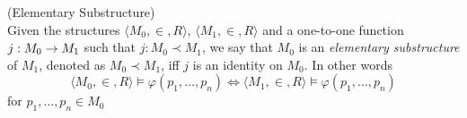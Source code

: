 \begin{definition}{(Elementary Substructure)}\label{def:elementary_substructure}\\
Given the structures $\langle M_0, \in, R \rangle$, $\langle M_1, \in, R \rangle$ and a one-to-one function $j: M_0 \rightarrow M_1$ such that $j: M_0 \prec M_1$, we say that $M_0$ is an \emph{elementary substructure} of $M_1$, denoted as $M_0 \prec M_1$, iff $j$ is an identity on $M_0$. In other words
\begin{equation}
\langle M_0, \in, R \rangle \models \varphi(p_1, \ldots, p_n) \iff \langle M_1, \in, R \rangle  \models \varphi(p_1, \ldots, p_n)
\end{equation}
for $p_1, \ldots, p_n \in M_0$
\end{definition}


